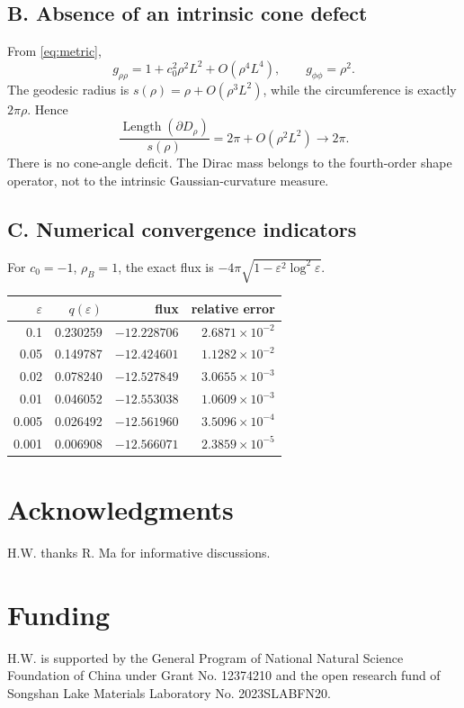 \documentclass[preprint,amsmath,amssymb,aps,prl,superscriptaddress,nofootinbib,floatfix]{revtex4-2}
\newcommand{\ack}[1]{\section*{Acknowledgments}#1}
\newcommand{\funding}[1]{%
  \section*{Funding}#1%
}
\begin{document}
\subsection*{B. Absence of an intrinsic cone defect}
From \eqref{eq:metric},
\[
g_{\rho\rho}=1+c_0^2\rho^2L^2+O(\rho^4L^4),\qquad g_{\phi\phi}=\rho^2.
\]
The geodesic radius is \(s(\rho)=\rho+O(\rho^3L^2)\), while the circumference is exactly \(2\pi\rho\). Hence
\[
\frac{\operatorname{Length}(\partial D_\rho)}{s(\rho)}=2\pi+O(\rho^2L^2)\longrightarrow2\pi.
\]
There is no cone-angle deficit. The Dirac mass belongs to the fourth-order shape operator, not to the intrinsic Gaussian-curvature measure.

\subsection*{C. Numerical convergence indicators}
For \(c_0=-1\), \(\rho_B=1\), the exact flux is \(-4\pi\sqrt{1-\varepsilon^2\log^2\varepsilon}\).
\begin{table}[b]
\centering
\renewcommand{\arraystretch}{1.5}
\setlength{\tabcolsep}{14pt}
\begin{tabular*}{\textwidth}{@{\extracolsep{\fill}}rrrr@{}}
\toprule
\(\varepsilon\) & \(q(\varepsilon)\) & flux & relative error \\
\midrule
0.1   & 0.230259 & \(-12.228706\) & \(2.6871\times10^{-2}\) \\
0.05  & 0.149787 & \(-12.424601\) & \(1.1282\times10^{-2}\) \\
0.02  & 0.078240 & \(-12.527849\) & \(3.0655\times10^{-3}\) \\
0.01  & 0.046052 & \(-12.553038\) & \(1.0609\times10^{-3}\) \\
0.005 & 0.026492 & \(-12.561960\) & \(3.5096\times10^{-4}\) \\
0.001 & 0.006908 & \(-12.566071\) & \(2.3859\times10^{-5}\) \\
\bottomrule
\end{tabular*}
\end{table}
%
%

\ack{H.W. thanks R. Ma for informative discussions.}

\funding{H.W. is supported by the General Program of National Natural Science Foundation of China under Grant No. 12374210 and the open research fund of Songshan Lake Materials Laboratory No. 2023SLABFN20.}
\end{document}

